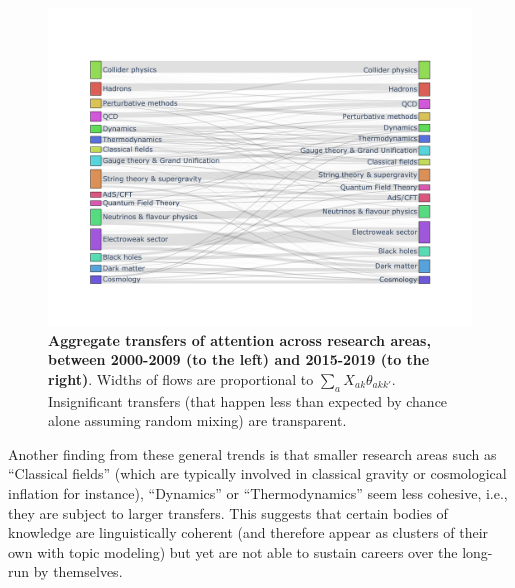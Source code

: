 \documentclass{article}
\begin{document}
 \begin{figure}[h]
     \centering
     \includegraphics[width=\textwidth]{plots/sankey_control.pdf}
     \caption{\textbf{Aggregate transfers of attention across research areas, between 2000-2009 (to the left) and 2015-2019 (to the right)}. Widths of flows are proportional to $\sum_a X_{ak}\theta_{akk'}$. Insignificant transfers (that happen less than expected by chance alone assuming random mixing) are transparent. }
     \label{fig:sankey}
 \end{figure}

Another finding from these general trends is that smaller research areas such as ``Classical fields'' (which are typically involved in classical gravity or cosmological inflation for instance), ``Dynamics'' or ``Thermodynamics'' seem less cohesive, i.e., they are subject to larger transfers. This suggests that certain bodies of knowledge are linguistically coherent (and therefore appear as clusters of their own with topic modeling) but yet are not able to sustain careers over the long-run by themselves.

\end{document}
